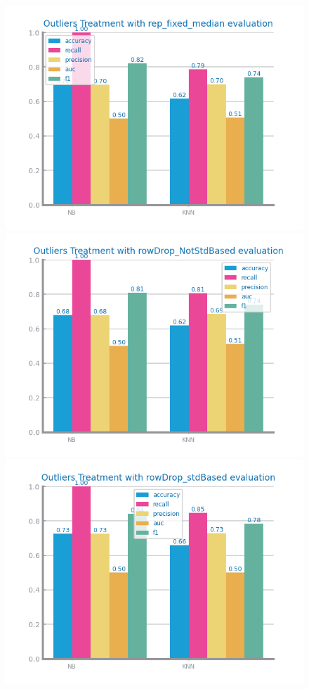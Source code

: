 \documentclass[10pt]{extarticle}
\begin{document}
\begin{figure}[H]
\centering\includegraphics[scale=0.8]{images/dataset2/data_preparation/Credit_Score_outliers_treat_rep_fixed_median.png}
\includegraphics[scale=0.8]{images/dataset2/data_preparation/Credit_Score_outliers_treat_rowDrop_NotStdBased.png}
\includegraphics[scale=0.8]{images/dataset2/data_preparation/Credit_Score_outliers_treat_rowDrop_StdBased.png}

\end{figure}
\end{document}
